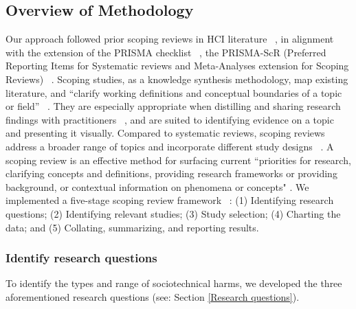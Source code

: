 \subsection{Overview of Methodology}
Our approach followed prior scoping reviews in HCI literature ~\cite{Disch_Fessl_Pammer-Schindler_2022, Ueno_Sawa_Kim_Urakami_Oura_Seaborn_2022}, in alignment with the extension of the PRISMA checklist ~\cite{Liberati_Altman_Tetzlaff_Mulrow_Gotzsche_Ioannidis_Clarke_Devereaux_Kleijnen_Moher_2009}, the PRISMA-ScR (Preferred Reporting Items for Systematic reviews and Meta-Analyses extension for Scoping Reviews) ~\cite{tricco2018prisma}. Scoping studies, as a knowledge synthesis methodology, map existing literature, and “clarify working definitions and conceptual boundaries of a topic or field” ~\cite[p. 141]{peters2015guidance}. They are especially appropriate when distilling and sharing research findings with practitioners ~\cite{tricco2016scoping}, and are suited to identifying evidence on a topic and presenting it visually. Compared to systematic reviews, scoping reviews address a broader range of topics and incorporate different study designs ~\cite{arksey2005scoping}. A scoping review is an effective method for surfacing current ``priorities for research, clarifying concepts and definitions, providing research frameworks or providing background, or contextual information on phenomena or concepts" \cite[p. 2104]{pollock_2021}. We implemented a five-stage scoping review framework ~\cite{Levac_Colquhoun_OBrien_2010, arksey2005scoping}: (1) Identifying research questions; (2) Identifying relevant studies; (3) Study selection; (4) Charting the data; and (5) Collating, summarizing, and reporting results.

\subsubsection{Identify research questions}
To identify the types and range of sociotechnical harms, we developed the three aforementioned research questions (see: Section \ref{Research questions}).

